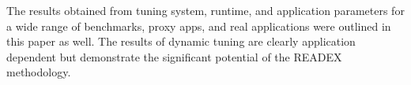 \documentclass[runningheads]{llncs}
\begin{document}
The results obtained from tuning system, runtime, and application parameters for a wide range of benchmarks, proxy apps, and real applications were outlined in this paper as well. The results of dynamic tuning are clearly application dependent but demonstrate the significant potential of the READEX methodology.



%
 
 
\end{document}
